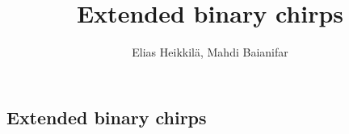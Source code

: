 \documentclass{article}
\title{Extended binary chirps}
\author{Elias Heikkilä, Mahdi Baianifar}
\date{}
\begin{document}
	\maketitle

\subsection*{Extended binary chirps}
\end{document}
